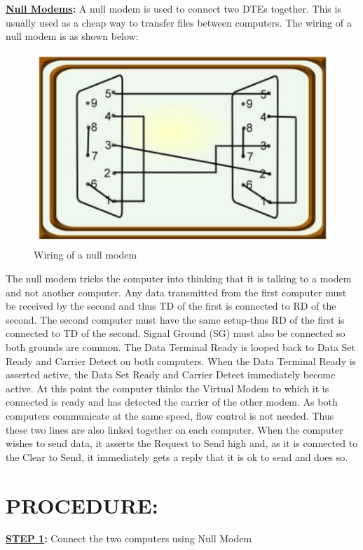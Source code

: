 \documentclass[a4paper,28pt,twoside,openright]{report}
\begin{document}
\bgroup
\textbf{\underline{Null Modems}:}
A null modem is used to connect two DTEs together. This is usually used as a cheap way to transfer files between computers. The wiring of a null modem is as shown below:
\begin{figure}[h]
\centering
\includegraphics[scale=0.5]{null-modem}
\caption{Wiring of a null modem}
\end{figure}
\egroup

The null modem tricks the computer into thinking that it is talking to a modem and not another computer. Any data transmitted from the first computer must be received by the second and thus TD of the first is connected to
RD of the second. The second computer must have the same setup-thus RD of the first is connected to TD of the second. Signal Ground (SG) must also be connected so both grounds are common. The Data Terminal Ready is looped back to Data Set Ready and Carrier Detect on both computers. When the Data Terminal Ready is asserted active, the Data Set Ready and Carrier Detect immediately become active. At this point the computer thinks the Virtual Modem to which it is connected is ready and has detected the carrier of the other modem. As both computers
communicate at the same speed, flow control is not needed. Thus these two lines are also linked together on each computer. When the computer wishes to send data, it asserts the Request to Send high and, as it is connected to the Clear to Send, it immediately gets a reply that it is ok to send and does so.

\section*{PROCEDURE:}
\textbf{\underline{STEP 1}:} Connect the two computers using Null Modem
\end{document}
